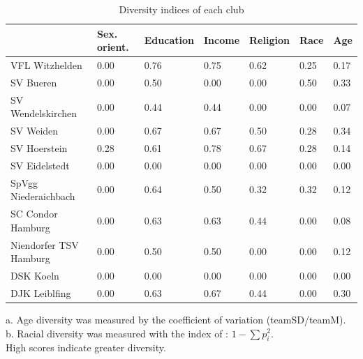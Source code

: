 \documentclass[	
	12pt, %
	a4paper, %
]{scrartcl}\usepackage[]{graphicx}\usepackage[]{color}
\begin{document}
\begin{table}[htb]
\caption{Diversity indices of each club}
\centering
\begin{tabularx}{\textwidth}{lXXXXXX}
\toprule
  & Sex. orient. & Education & Income & Religion & Race & Age \\ 
\midrule
VFL Witzhelden & 0.00 & 0.76 &0.75 &0.62 &0.25&0.17 \\
SV Bueren & 0.00 & 0.50 & 0.00 & 0.00 & 0.50&0.33\\
SV Wendelskirchen & 0.00 & 0.44 & 0.44 & 0.00 & 0.00&0.07 \\
SV Weiden & 0.00 & 0.67 & 0.67 & 0.50 & 0.28 &0.34\\
SV Hoerstein & 0.28 & 0.61 & 0.78 & 0.67& 0.28&0.14 \\
SV Eidelstedt & 0.00 & 0.00 &0.00 &0.00 &0.00  &0.00\\
SpVgg Niederaichbach & 0.00 & 0.64 &0.50 &0.32 &0.32&0.12 \\
SC Condor Hamburg & 0.00 & 0.63 & 0.63& 0.44 & 0.00&0.08\\
Niendorfer TSV Hamburg & 0.00 & 0.50 & 0.50& 0.00&0.00&0.12 \\
DSK Koeln & 0.00 & 0.00 & 0.00 & 0.00 & 0.00  &0.00\\ 
DJK Leiblfing & 0.00 & 0.63 & 0.67 & 0.44 & 0.00&0.30 \\ 
\bottomrule
\end{tabularx} 
\begin{flushleft}
a. Age diversity was measured by the coefficient of variation (teamSD/teamM).\\
b. Racial diversity was measured with the index of : $ 1 - \sum p_i^{2} $. \\
High scores indicate greater diversity.
\end{flushleft}
\label{tab:indices}
\end{table}
\end{document}
